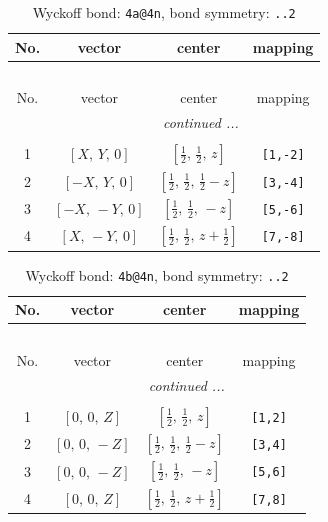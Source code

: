 \documentclass[fleqn,8pt]{jsarticle}
\begin{document}
\begin{longtable}{cccc}
\caption{Wyckoff bond: {\tt 4a@4n}, bond symmetry: {\tt ..2}}
 \\
 \hline \hline
No. & vector & center & mapping \\ \hline \endfirsthead

\multicolumn{3}{l}{\tablename\ \thetable{}} \\
 \hline \hline
No. & vector & center & mapping \\ \hline \endhead

 \hline \hline
\multicolumn{3}{r}{\footnotesize\it continued ...} \\ \endfoot

 \hline \hline
\multicolumn{3}{r}{} \\ \endlastfoot

1 & $\left[ X,\, Y,\, 0 \right]$ & $\left[ \frac{1}{2},\, \frac{1}{2},\, z \right]$ & {\tt [1,-2]} \\ \hline
2 & $\left[ - X,\, Y,\, 0 \right]$ & $\left[ \frac{1}{2},\, \frac{1}{2},\, \frac{1}{2} - z \right]$ & {\tt [3,-4]} \\ \hline
3 & $\left[ - X,\, - Y,\, 0 \right]$ & $\left[ \frac{1}{2},\, \frac{1}{2},\, - z \right]$ & {\tt [5,-6]} \\ \hline
4 & $\left[ X,\, - Y,\, 0 \right]$ & $\left[ \frac{1}{2},\, \frac{1}{2},\, z + \frac{1}{2} \right]$ & {\tt [7,-8]} \\
\end{longtable}
\renewcommand{\arraystretch}{1.2}
\begin{longtable}{cccc}
\caption{Wyckoff bond: {\tt 4b@4n}, bond symmetry: {\tt ..2}}
 \\
 \hline \hline
No. & vector & center & mapping \\ \hline \endfirsthead

\multicolumn{3}{l}{\tablename\ \thetable{}} \\
 \hline \hline
No. & vector & center & mapping \\ \hline \endhead

 \hline \hline
\multicolumn{3}{r}{\footnotesize\it continued ...} \\ \endfoot

 \hline \hline
\multicolumn{3}{r}{} \\ \endlastfoot

1 & $\left[ 0,\, 0,\, Z \right]$ & $\left[ \frac{1}{2},\, \frac{1}{2},\, z \right]$ & {\tt [1,2]} \\ \hline
2 & $\left[ 0,\, 0,\, - Z \right]$ & $\left[ \frac{1}{2},\, \frac{1}{2},\, \frac{1}{2} - z \right]$ & {\tt [3,4]} \\ \hline
3 & $\left[ 0,\, 0,\, - Z \right]$ & $\left[ \frac{1}{2},\, \frac{1}{2},\, - z \right]$ & {\tt [5,6]} \\ \hline
4 & $\left[ 0,\, 0,\, Z \right]$ & $\left[ \frac{1}{2},\, \frac{1}{2},\, z + \frac{1}{2} \right]$ & {\tt [7,8]} \\
\end{longtable}
\end{document}
